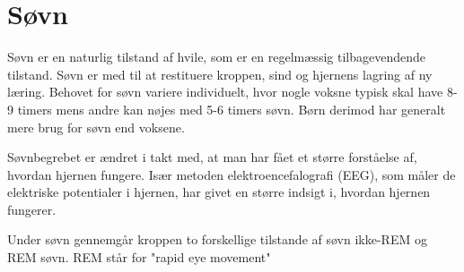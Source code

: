 \section{Søvn}\label{sec:Soevn_generelt}
Søvn er en naturlig tilstand af hvile, som er en regelmæssig tilbagevendende tilstand. Søvn er med til at restituere kroppen, sind og hjernens lagring af ny læring. Behovet for søvn variere individuelt, hvor nogle voksne typisk skal have 8-9 timers mens andre kan nøjes med 5-6 timers søvn. Børn derimod har generalt mere brug for søvn end voksene. 

Søvnbegrebet er ændret i takt med, at man har fået et større forståelse af, hvordan hjernen fungere. Især metoden elektroencefalografi (EEG), som måler de elektriske potentialer i hjernen, har givet en større indsigt i, hvordan hjernen fungerer.

Under søvn gennemgår kroppen to forskellige tilstande af søvn ikke-REM og REM søvn. REM står for "rapid eye movement"  
